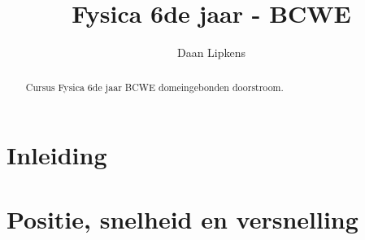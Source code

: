 \documentclass[nonewpage]{xourse}
\title{Fysica 6de jaar - BCWE}
\author{Daan Lipkens}
\begin{document}
\begin{abstract}
    Cursus Fysica 6de jaar BCWE domeingebonden doorstroom.
\end{abstract}
\maketitle




 \inleidingstart %
 \part{Inleiding}
 \inleidingstop


\part{Positie, snelheid en versnelling}
\end{document}
